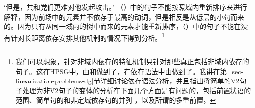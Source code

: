 \glt `但是，共和党们更难对他发起攻击。'
\zl
（）中的句子不能按照域内重新排序来进行解释，因为前场中的元素并不依存于最高的动词，但是相反是从低层的小句而来的。因为只有从同一域内的树中而来的元素才能重新排序，（）中的句子不能在没有针对长距离依存安排其他机制的情况下得到分析。\footnote{
我们可以想象，针对非域内依存的特征机制只针对那些真正包括非域内依存的句子。这在HPSG\indexhpsg 中，由\citet{Kathol95a}和\citet{Wetta2011a}做到了，在依存语法中由\citet{GO2009a}做到了。我讲在第~\ref{sec-linearization-problems-dg}节详细讨论依存语法分析，并且指出将简单的V2句子处理为非V2句子的变体的分析在下面几个方面是有问题的，包括前置状语的范围、简单句的和非定域依存句的并列 ，以及所谓的多重前置。
}

